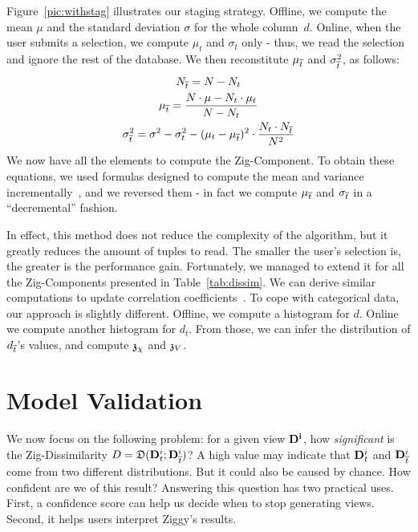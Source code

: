 Figure~\ref{pic:withstag} illustrates our staging strategy. Offline, we compute
the mean $\mu$ and the standard deviation $\sigma$ for the whole column~$d$.
Online, when the user submits a selection, we compute  $\mu_t$ and $\sigma_t$
only - thus, we read the selection and ignore the rest of the database. We then
reconstitute $\mu_{\overline{t}}$ and $\sigma_{\overline{t}}^2$, as follows:
\begin{gather}
    N_{\overline{t}} = N - N_t\\
    \mu_{\overline{t}}= \frac{ N \cdot \mu -  N_t \cdot \mu_t } { N - N_t } \\
    \sigma_{\overline{t}}^2 = \sigma^2 - \sigma_t^2 -
    (\mu_t - \mu_{\overline{t}})^2 \cdot \frac{N_t \cdot N_{\overline{t}}}{N^2}
\end{gather}
We now have all the elements to compute the Zig-Component. To obtain these
equations, we used formulas designed to compute the mean and variance
incrementally~\cite{pebay2008formulas}, and we reversed them - in fact we
compute $\mu_{\overline{t}}$ and $\sigma_{\overline{t}}$ in a ``decremental'' fashion.

In effect, this method does not reduce the complexity of the algorithm, but it
greatly reduces the amount of tuples to read. The smaller the user's selection
is, the greater is the performance gain. Fortunately, we managed to extend it
for all the Zig-Components presented in Table~\ref{tab:dissim}.  We can derive
similar computations to update correlation
coefficients~\cite{pebay2008formulas}. To cope with categorical data, our
approach is slightly different. Offline, we compute a histogram for $d$. Online
we compute another histogram for $d_t$. From those, we can infer the
distribution of $d_{\overline{t}}$'s values, and compute $\mathfrak{z}_\chi$ and $\mathfrak{z}_V$.

\section{Model Validation}
\label{sec:validation}


We now focus on the following problem: for a given view $\mathbf{D^i}$, how
\emph{significant} is the Zig-Dissimilarity $D = \mathfrak{D}( \mathbf{D}^i_t  ;
\mathbf{D}^i_{\overline{t}})$? A high value may indicate that $\mathbf{D}^i_t$ and
$\mathbf{D}^i_{\overline{t}}$ come from two different distributions.  But it could
also be caused by chance. How confident are we of this result? Answering this
question has two practical uses. First, a confidence score can help us decide
when to stop generating views. Second, it helps users interpret Ziggy's results.

